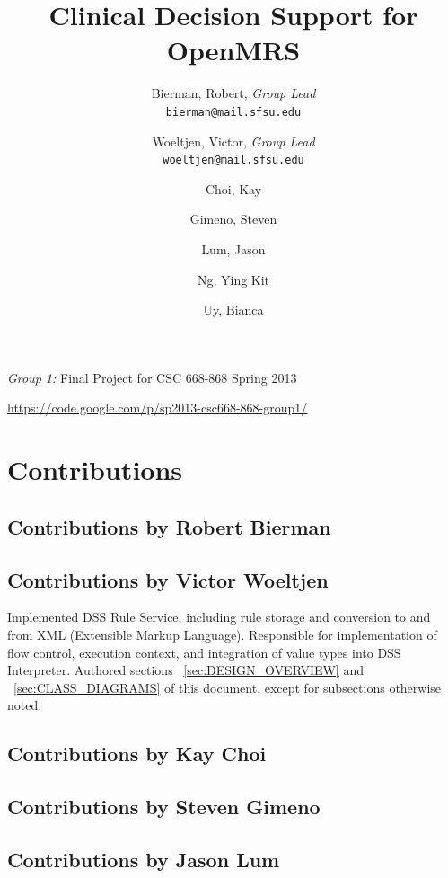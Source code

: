 \documentclass[12pt,letterpaper]{article}
\title{
  Clinical Decision Support for OpenMRS
}
\author{
        Bierman, Robert,  \emph{Group Lead}  \\ \texttt{bierman@mail.sfsu.edu} \and 
        Woeltjen, Victor, \emph{Group Lead}  \\ \texttt{woeltjen@mail.sfsu.edu} \and
        Choi, Kay       \and
        Gimeno, Steven  \and
        Lum, Jason      \and
        Ng, Ying Kit    \and
        Uy, Bianca      
}
\begin{document}
\newpage 

\maketitle
\begin{center}
\begin{Large}\emph{Group 1:} Final Project for CSC 668-868 Spring 2013\end{Large} \linebreak
\url{https://code.google.com/p/sp2013-csc668-868-group1/}
\end{center}
\thispagestyle{empty} %

\newpage {}
\tableofcontents


\newpage {}
\section{Contributions} 

\subsection{Contributions by Robert Bierman}

\subsection{Contributions by Victor Woeltjen}

Implemented DSS Rule Service, including rule storage and conversion to and from XML (Extensible Markup Language). Responsible for implementation of flow control, execution 
context, and integration of value types into DSS Interpreter. Authored sections 
~\ref{sec:DESIGN_OVERVIEW} and
~\ref{sec:CLASS_DIAGRAMS} of this document, except for subsections otherwise noted.

\subsection{Contributions by Kay Choi}

\subsection{Contributions by Steven Gimeno}

\subsection{Contributions by Jason Lum}
\end{document}
